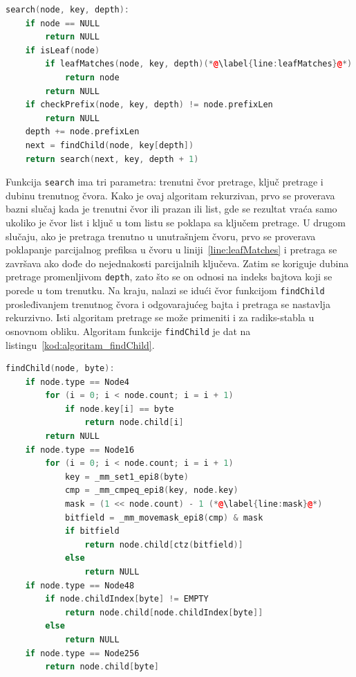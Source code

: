\documentclass[12pt,oneside]{memoir}
\begin{document}
\begin{lstlisting}[language=C++,
                   caption={Algoritam pretrage strukture podataka ART},
                   label={kod:algoritam_pretrage}]
search(node, key, depth):
    if node == NULL
        return NULL
    if isLeaf(node)
        if leafMatches(node, key, depth)(*@\label{line:leafMatches}@*)
            return node
        return NULL
    if checkPrefix(node, key, depth) != node.prefixLen
        return NULL
    depth += node.prefixLen
    next = findChild(node, key[depth])
    return search(next, key, depth + 1)
\end{lstlisting}

Funkcija \texttt{search} ima tri parametra: trenutni čvor pretrage, ključ
pretrage i dubinu trenutnog čvora. Kako je ovaj algoritam rekurzivan,
prvo se proverava bazni slučaj kada je trenutni čvor ili prazan ili
list, gde se rezultat vraća samo ukoliko je čvor list i ključ u tom listu
se poklapa sa ključem pretrage. U drugom slučaju, ako je pretraga trenutno
u unutrašnjem čvoru, prvo se proverava poklapanje parcijalnog prefiksa
u čvoru u liniji~\ref{line:leafMatches} i pretraga se završava ako dođe
do nejednakosti parcijalnih ključeva. Zatim se koriguje dubina pretrage
promenljivom \texttt{depth},
zato što se on odnosi na indeks bajtova koji se
porede u tom trenutku.
Na kraju, nalazi se idući čvor funkcijom \texttt{findChild} prosleđivanjem
trenutnog čvora i odgovarajućeg bajta i pretraga se
nastavlja rekurzivno. Isti algoritam pretrage se može primeniti i za
radiks-stabla u osnovnom obliku. Algoritam funkcije
\texttt{findChild} je dat na listingu~\ref{kod:algoritam_findChild}.

\begin{lstlisting}[language=C++,
                   caption={Algoritam pronalaska idućeg čvora pretrage},
                   label={kod:algoritam_findChild}]
findChild(node, byte):
    if node.type == Node4
        for (i = 0; i < node.count; i = i + 1)
            if node.key[i] == byte
                return node.child[i]
        return NULL
    if node.type == Node16
        for (i = 0; i < node.count; i = i + 1)
            key = _mm_set1_epi8(byte)
            cmp = _mm_cmpeq_epi8(key, node.key)
            mask = (1 << node.count) - 1 (*@\label{line:mask}@*)
            bitfield = _mm_movemask_epi8(cmp) & mask
            if bitfield
                return node.child[ctz(bitfield)]
            else
                return NULL
    if node.type == Node48
        if node.childIndex[byte] != EMPTY
            return node.child[node.childIndex[byte]]
        else
            return NULL
    if node.type == Node256
        return node.child[byte]
\end{lstlisting}
\end{document}
